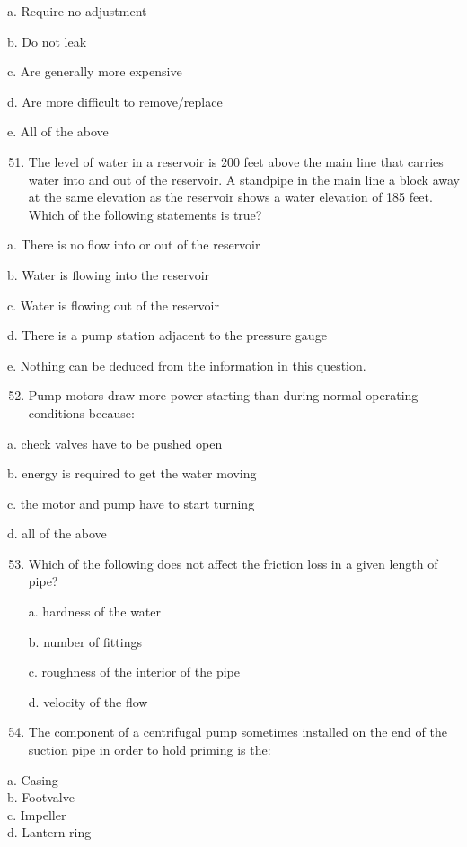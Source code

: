 \documentclass[10pt]{article}
\begin{document}
\begin{enumerate}
\begin{enumerate}
a. Require no adjustment

b. Do not leak

c. Are generally more expensive

d. Are more difficult to remove/replace

e. All of the above

\begin{enumerate}
  \setcounter{enumi}{50}
  \item The level of water in a reservoir is 200 feet above the main line that carries water into and out of the reservoir. A standpipe in the main line a block away at the same elevation as the reservoir shows a water elevation of 185 feet. Which of the following statements is true?
\end{enumerate}

a. There is no flow into or out of the reservoir

b. Water is flowing into the reservoir

c. Water is flowing out of the reservoir

d. There is a pump station adjacent to the pressure gauge

e. Nothing can be deduced from the information in this question.

\begin{enumerate}
  \setcounter{enumi}{51}
  \item Pump motors draw more power starting than during normal operating conditions because:
\end{enumerate}

a. check valves have to be pushed open

b. energy is required to get the water moving

c. the motor and pump have to start turning

d. all of the above

\begin{enumerate}
  \setcounter{enumi}{52}
  \item Which of the following does not affect the friction loss in a given length of pipe?


a. hardness of the water

b. number of fittings

c. roughness of the interior of the pipe

d. velocity of the flow 

\item The component of a centrifugal pump sometimes installed on the end of the suction pipe in order to hold priming is the:\\
\end{enumerate}
a. Casing\\
b. Footvalve\\
c. Impeller\\
d. Lantern ring\\


\end{enumerate}
\end{enumerate}
\end{document}
